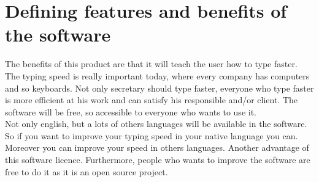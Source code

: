 \chapter{Defining features and benefits of the software}
The benefits of this product are that it will teach the user how to type faster. The typing speed is really important today, where every company has computers and so keyboards. Not only secretary should type faster, everyone who type faster is more efficient at his work and can satisfy his responsible and/or client. The software will be free, so accessible to everyone who wants to use it. \\
Not only english, but a lots of others languages will be available in the software. So if you want to improve your typing speed in your native language you can. Moreover you can improve your speed in others languages.
Another advantage of this software licence. Furthermore, people who wants to improve the software are free to do it as it is an open source project. 

